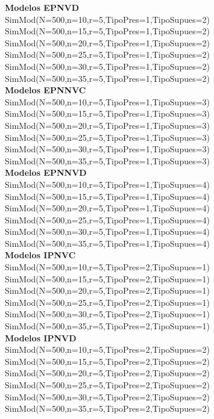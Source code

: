 \textbf{Modelos EPNVD}\\
SimMod(N=500,n=10,r=5,TipoPres=1,TipoSupues=2)\\
SimMod(N=500,n=15,r=5,TipoPres=1,TipoSupues=2)\\
SimMod(N=500,n=20,r=5,TipoPres=1,TipoSupues=2)\\
SimMod(N=500,n=25,r=5,TipoPres=1,TipoSupues=2)\\
SimMod(N=500,n=30,r=5,TipoPres=1,TipoSupues=2)\\
SimMod(N=500,n=35,r=5,TipoPres=1,TipoSupues=2)\\

\textbf{Modelos EPNNVC}\\
SimMod(N=500,n=10,r=5,TipoPres=1,TipoSupues=3)\\
SimMod(N=500,n=15,r=5,TipoPres=1,TipoSupues=3)\\
SimMod(N=500,n=20,r=5,TipoPres=1,TipoSupues=3)\\
SimMod(N=500,n=25,r=5,TipoPres=1,TipoSupues=3)\\
SimMod(N=500,n=30,r=5,TipoPres=1,TipoSupues=3)\\
SimMod(N=500,n=35,r=5,TipoPres=1,TipoSupues=3)\\

\textbf{Modelos EPNNVD}\\
SimMod(N=500,n=10,r=5,TipoPres=1,TipoSupues=4)\\
SimMod(N=500,n=15,r=5,TipoPres=1,TipoSupues=4)\\
SimMod(N=500,n=20,r=5,TipoPres=1,TipoSupues=4)\\
SimMod(N=500,n=25,r=5,TipoPres=1,TipoSupues=4)\\
SimMod(N=500,n=30,r=5,TipoPres=1,TipoSupues=4)\\
SimMod(N=500,n=35,r=5,TipoPres=1,TipoSupues=4)\\

\textbf{Modelos IPNVC}\\
SimMod(N=500,n=10,r=5,TipoPres=2,TipoSupues=1)\\
SimMod(N=500,n=15,r=5,TipoPres=2,TipoSupues=1)\\
SimMod(N=500,n=20,r=5,TipoPres=2,TipoSupues=1)\\
SimMod(N=500,n=25,r=5,TipoPres=2,TipoSupues=1)\\
SimMod(N=500,n=30,r=5,TipoPres=2,TipoSupues=1)\\
SimMod(N=500,n=35,r=5,TipoPres=2,TipoSupues=1)\\

\textbf{Modelos IPNVD}\\
SimMod(N=500,n=10,r=5,TipoPres=2,TipoSupues=2)\\
SimMod(N=500,n=15,r=5,TipoPres=2,TipoSupues=2)\\
SimMod(N=500,n=20,r=5,TipoPres=2,TipoSupues=2)\\
SimMod(N=500,n=25,r=5,TipoPres=2,TipoSupues=2)\\
SimMod(N=500,n=30,r=5,TipoPres=2,TipoSupues=2)\\
SimMod(N=500,n=35,r=5,TipoPres=2,TipoSupues=2)\\

